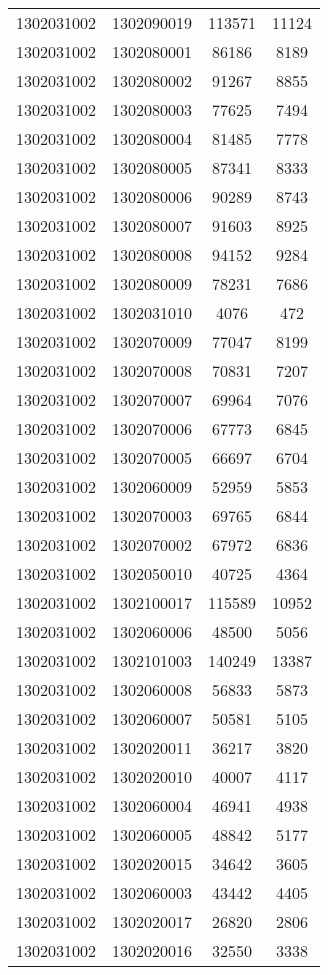 \begin{longtable}{llcc}
1302031002 & 1302090019 & 113571 & 11124\\
1302031002 & 1302080001 & 86186 & 8189\\
1302031002 & 1302080002 & 91267 & 8855\\
1302031002 & 1302080003 & 77625 & 7494\\
1302031002 & 1302080004 & 81485 & 7778\\
1302031002 & 1302080005 & 87341 & 8333\\
1302031002 & 1302080006 & 90289 & 8743\\
1302031002 & 1302080007 & 91603 & 8925\\
1302031002 & 1302080008 & 94152 & 9284\\
1302031002 & 1302080009 & 78231 & 7686\\
1302031002 & 1302031010 & 4076 & 472\\
1302031002 & 1302070009 & 77047 & 8199\\
1302031002 & 1302070008 & 70831 & 7207\\
1302031002 & 1302070007 & 69964 & 7076\\
1302031002 & 1302070006 & 67773 & 6845\\
1302031002 & 1302070005 & 66697 & 6704\\
1302031002 & 1302060009 & 52959 & 5853\\
1302031002 & 1302070003 & 69765 & 6844\\
1302031002 & 1302070002 & 67972 & 6836\\
1302031002 & 1302050010 & 40725 & 4364\\
1302031002 & 1302100017 & 115589 & 10952\\
1302031002 & 1302060006 & 48500 & 5056\\
1302031002 & 1302101003 & 140249 & 13387\\
1302031002 & 1302060008 & 56833 & 5873\\
1302031002 & 1302060007 & 50581 & 5105\\
1302031002 & 1302020011 & 36217 & 3820\\
1302031002 & 1302020010 & 40007 & 4117\\
1302031002 & 1302060004 & 46941 & 4938\\
1302031002 & 1302060005 & 48842 & 5177\\
1302031002 & 1302020015 & 34642 & 3605\\
1302031002 & 1302060003 & 43442 & 4405\\
1302031002 & 1302020017 & 26820 & 2806\\
1302031002 & 1302020016 & 32550 & 3338\\

\end{longtable}
